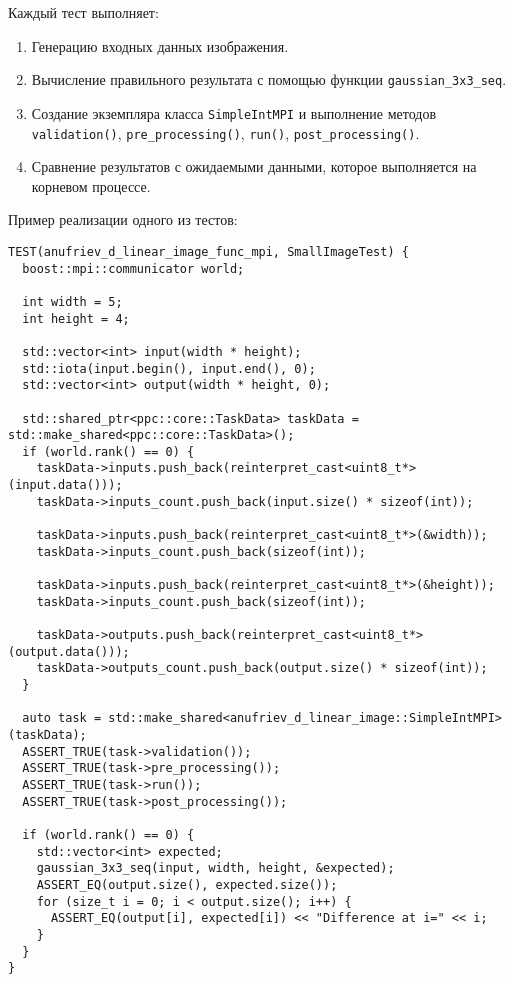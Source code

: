\documentclass[12pt]{article}
\begin{document}
Каждый тест выполняет:
\begin{enumerate}
    \item Генерацию входных данных изображения.
    \item Вычисление правильного результата с помощью функции \texttt{gaussian\_3x3\_seq}.
    \item Создание экземпляра класса \texttt{SimpleIntMPI} и выполнение методов \texttt{validation()}, \texttt{pre\_processing()}, \texttt{run()}, \texttt{post\_processing()}.
    \item Сравнение результатов с ожидаемыми данными, которое выполняется на корневом процессе.
\end{enumerate}

Пример реализации одного из тестов:

\begin{lstlisting}
TEST(anufriev_d_linear_image_func_mpi, SmallImageTest) {
  boost::mpi::communicator world;

  int width = 5;
  int height = 4;

  std::vector<int> input(width * height);
  std::iota(input.begin(), input.end(), 0);
  std::vector<int> output(width * height, 0);

  std::shared_ptr<ppc::core::TaskData> taskData = std::make_shared<ppc::core::TaskData>();
  if (world.rank() == 0) {
    taskData->inputs.push_back(reinterpret_cast<uint8_t*>(input.data()));
    taskData->inputs_count.push_back(input.size() * sizeof(int));

    taskData->inputs.push_back(reinterpret_cast<uint8_t*>(&width));
    taskData->inputs_count.push_back(sizeof(int));

    taskData->inputs.push_back(reinterpret_cast<uint8_t*>(&height));
    taskData->inputs_count.push_back(sizeof(int));

    taskData->outputs.push_back(reinterpret_cast<uint8_t*>(output.data()));
    taskData->outputs_count.push_back(output.size() * sizeof(int));
  }

  auto task = std::make_shared<anufriev_d_linear_image::SimpleIntMPI>(taskData);
  ASSERT_TRUE(task->validation());
  ASSERT_TRUE(task->pre_processing());
  ASSERT_TRUE(task->run());
  ASSERT_TRUE(task->post_processing());

  if (world.rank() == 0) {
    std::vector<int> expected;
    gaussian_3x3_seq(input, width, height, &expected);
    ASSERT_EQ(output.size(), expected.size());
    for (size_t i = 0; i < output.size(); i++) {
      ASSERT_EQ(output[i], expected[i]) << "Difference at i=" << i;
    }
  }
}
\end{lstlisting}
\end{document}
